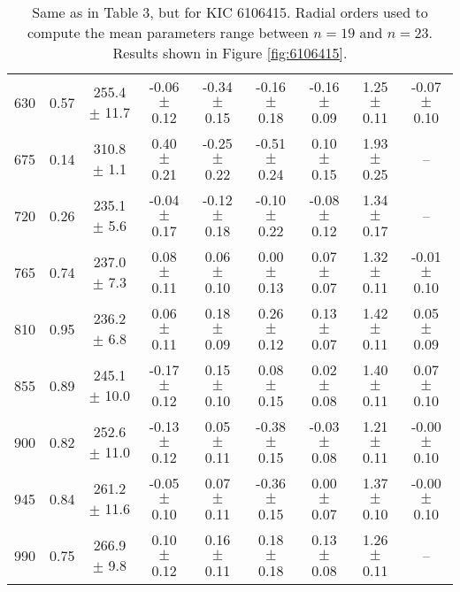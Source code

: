 \documentclass[twocolumn]{aastex61}%
\begin{document}
\begin{table*}[ht]
\begin{tabular}{ccc|ccccc|c}
630 & 0.57 & 255.4 $\pm$ 11.7 & -0.06 $\pm$ 0.12 & -0.34 $\pm$ 0.15 & -0.16 $\pm$ 0.18 & -0.16 $\pm$ 0.09 & 1.25 $\pm$ 0.11 & -0.07 $\pm$ 0.10\\
675 & 0.14 & 310.8 $\pm$ 1.1 & 0.40 $\pm$ 0.21 & -0.25 $\pm$ 0.22 & -0.51 $\pm$ 0.24 & 0.10 $\pm$ 0.15 & 1.93 $\pm$ 0.25 & --\\
720 & 0.26 & 235.1 $\pm$ 5.6 & -0.04 $\pm$ 0.17 & -0.12 $\pm$ 0.18 & -0.10 $\pm$ 0.22 & -0.08 $\pm$ 0.12 & 1.34 $\pm$ 0.17 & --\\
765 & 0.74 & 237.0 $\pm$ 7.3 & 0.08 $\pm$ 0.11 & 0.06 $\pm$ 0.10 & 0.00 $\pm$ 0.13 & 0.07 $\pm$ 0.07 & 1.32 $\pm$ 0.11 & -0.01 $\pm$ 0.10\\
810 & 0.95 & 236.2 $\pm$ 6.8 & 0.06 $\pm$ 0.11 & 0.18 $\pm$ 0.09 & 0.26 $\pm$ 0.12 & 0.13 $\pm$ 0.07 & 1.42 $\pm$ 0.11 & 0.05 $\pm$ 0.09\\
855 & 0.89 & 245.1 $\pm$ 10.0 & -0.17 $\pm$ 0.12 & 0.15 $\pm$ 0.10 & 0.08 $\pm$ 0.15 & 0.02 $\pm$ 0.08 & 1.40 $\pm$ 0.11 & 0.07 $\pm$ 0.10\\
900 & 0.82 & 252.6 $\pm$ 11.0 & -0.13 $\pm$ 0.12 & 0.05 $\pm$ 0.11 & -0.38 $\pm$ 0.15 & -0.03 $\pm$ 0.08 & 1.21 $\pm$ 0.11 & -0.00 $\pm$ 0.10\\
945 & 0.84 & 261.2 $\pm$ 11.6 & -0.05 $\pm$ 0.10 & 0.07 $\pm$ 0.11 & -0.36 $\pm$ 0.15 & 0.00 $\pm$ 0.07 & 1.37 $\pm$ 0.10 & -0.00 $\pm$ 0.10\\
990 & 0.75 & 266.9 $\pm$ 9.8 & 0.10 $\pm$ 0.12 & 0.16 $\pm$ 0.11 & 0.18 $\pm$ 0.18 & 0.13 $\pm$ 0.08 & 1.26 $\pm$ 0.11 & --\\
\end{tabular}
\caption{Same as in Table 3, but for KIC 6106415. Radial orders used to compute the mean parameters range between $n=19$ and $n=23$. Results shown in Figure \ref{fig:6106415}.}\label{tab:6106415}
\end{table*}
\end{document}
